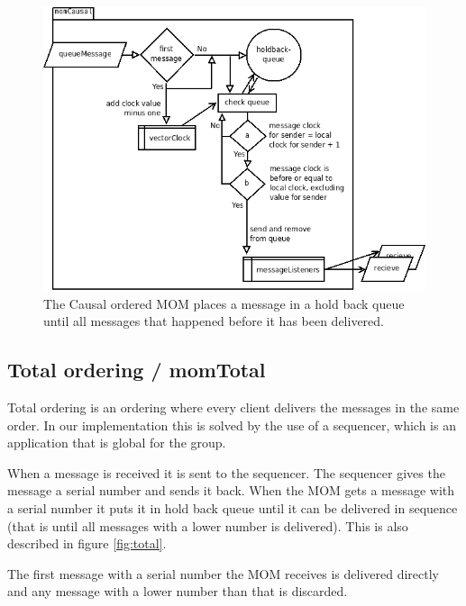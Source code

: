 \documentclass[english]{article}
\begin{document}
\begin{figure}
\includegraphics[width=\textwidth]{momCausal.png}
\caption{The Causal ordered MOM places a message in a hold back queue until all messages that happened before it has been delivered.}
\label{fig:causal}
\end{figure}

\subsection{Total ordering / momTotal}
\label{mo-total}
Total ordering is an ordering where every client delivers the messages in the same order. In our implementation this is solved by the use of a sequencer, which is an application that is global for the group. 

When a message is received it is sent to the sequencer. The sequencer gives the message a serial number and sends it back. When the MOM gets a message with a serial number it puts it in hold back queue until it can be delivered in sequence (that is until all messages with a lower number is delivered). This is also described in figure \vref{fig:total}.

The first message with a serial number the MOM receives is delivered directly and any message with a lower number than that is discarded.
\end{document}
